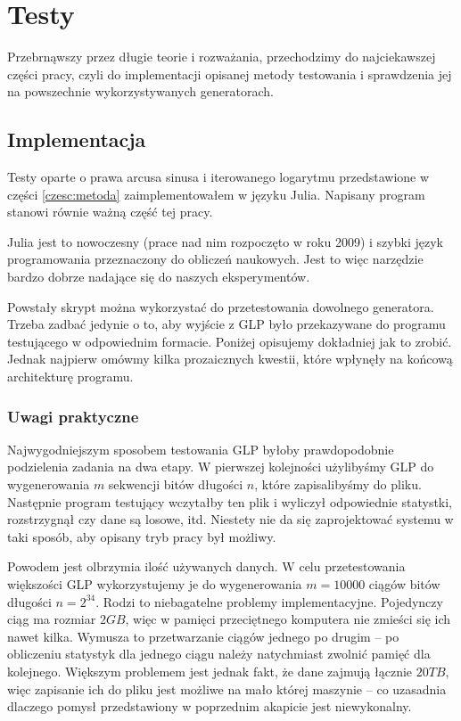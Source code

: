 \documentclass[a4paper,11pt,twoside]{book}
\theoremstyle{definition}
\begin{document}
\chapter{Testy}
\label{czesc:testy}

Przebrnąwszy przez długie teorie i rozważania, przechodzimy do najciekawszej części pracy, czyli do implementacji opisanej metody testowania i sprawdzenia jej na powszechnie wykorzystywanych generatorach.

\section{Implementacja}
Testy oparte o prawa arcusa sinusa i iterowanego logarytmu przedstawione w części \ref{czesc:metoda} zaimplementowałem w języku Julia. Napisany program stanowi równie ważną część tej pracy.

Julia jest to nowoczesny (prace nad nim rozpoczęto w roku 2009) i szybki język programowania przeznaczony do obliczeń naukowych. Jest to więc narzędzie bardzo dobrze nadające się do naszych eksperymentów.

Powstały skrypt można wykorzystać do przetestowania dowolnego generatora. Trzeba zadbać jedynie o to, aby wyjście z GLP było przekazywane do programu testującego w odpowiednim formacie. Poniżej opisujemy dokładniej jak to zrobić. Jednak najpierw omówmy kilka prozaicznych kwestii, które wpłynęły na końcową architekturę programu.

\subsection{Uwagi praktyczne}
Najwygodniejszym sposobem testowania GLP byłoby prawdopodobnie podzielenia zadania na dwa etapy. W pierwszej kolejności użylibyśmy GLP do wygenerowania $m$ sekwencji bitów długości $n$, które zapisalibyśmy do pliku. Następnie program testujący wczytałby ten plik i wyliczył odpowiednie statystki, rozstrzygnął czy dane są losowe, itd. Niestety nie da się zaprojektować systemu w taki sposób, aby opisany tryb pracy był możliwy.

Powodem jest olbrzymia ilość używanych danych. W celu przetestowania większości GLP wykorzystujemy je do wygenerowania $m = 10000$ ciągów bitów długości $n = 2^{34}$. Rodzi to niebagatelne problemy implementacyjne. Pojedynczy ciąg ma rozmiar $2GB$, więc w pamięci przeciętnego komputera nie zmieści się ich nawet kilka. Wymusza to przetwarzanie ciągów jednego po drugim -- po obliczeniu statystyk dla jednego ciągu należy natychmiast zwolnić pamięć dla kolejnego. Większym problemem jest jednak fakt, że dane zajmują łącznie $20TB$, więc zapisanie ich do pliku jest możliwe na mało której maszynie -- co uzasadnia dlaczego pomysł przedstawiony w poprzednim akapicie jest niewykonalny.
\end{document}

